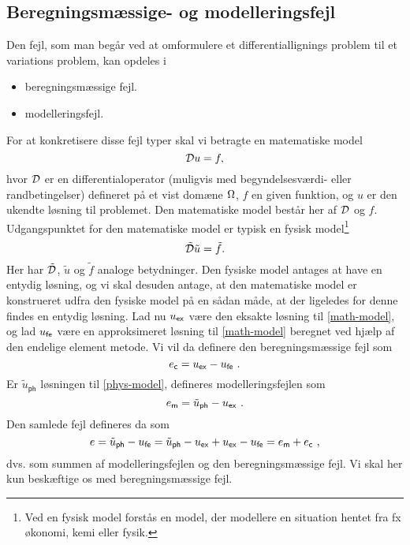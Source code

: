 \subsection{Beregningsmæssige- og modelleringsfejl}
Den fejl, som man begår ved at omformulere et differentiallignings
problem til et variations problem, kan opdeles i
\begin{itemize}
  \item beregningsmæssige fejl.
  \item modelleringsfejl.
\end{itemize}
For at konkretisere disse fejl typer skal vi betragte en matematiske model
\begin{equation} \label{math-model}
  {\mathcal{D}} u=f,
\end{equation}
hvor ${\mathcal{D}}$ er en differentialoperator (muligvis med begyndelsesværdi-
eller rand\-be\-tin\-gel\-ser) defineret på et vist domæne $\Omega$, $f$ en
given funktion, og $u$ er den ukendte løsning til problemet. Den
matematiske model består her af ${\mathcal{D}}$ og $f$. Udgangspunktet for den
matematiske model er typisk en fysisk model\footnote{Ved en fysisk
model forstås en model, der modellere en situation hentet fra fx
økonomi, kemi eller fysik.}
\begin{equation} \label{phys-model}
  \tilde{{\mathcal{D}}} \tilde{u} = \tilde{f}.
\end{equation}
Her har $\tilde{{\mathcal{D}}}$, $\tilde{u}$ og $\tilde{f}$ analoge betydninger.
Den fysiske model antages at have en entydig løsning, og vi skal
desuden antage, at den matematiske model er konstrueret udfra den
fysiske model på en sådan måde, at der ligeledes for denne findes en
entydig løsning. Lad nu $u_{\mathsf{ex}}$ være den eksakte løsning til
\eqref{math-model}, og lad $u_{\mathsf{fe}}$ være en approksimeret
løsning til \eqref{math-model} beregnet ved hjælp af den endelige
element metode. Vi vil da definere den beregningsmæssige fejl som
\begin{equation}
  e_{\mathsf{c}} = \uex - \ufe\ .
\end{equation}
Er $\tilde{u}_{\mathsf{ph}}$ løsningen til \eqref{phys-model},
defineres modelleringsfejlen som
\begin{equation}
  e_{\mathsf{m}} = \tilde{u}_{\mathsf{ph}} - u_{\mathsf{ex}}\ .
\end{equation}
Den samlede fejl defineres da som
\begin{equation}
  e=\tilde{u}_{\mathsf{ph}}-u_{\mathsf{fe}}=\tilde{u}_{\mathsf{ph}}-u_{\mathsf{ex}}+u_{\mathsf{ex}}-u_{\mathsf{fe}}
  =e_{\mathsf{m}} + e_{\mathsf{c}}\ ,
\end{equation}
dvs. som summen af modelleringsfejlen og den beregningsmæssige fejl.
Vi skal her  kun beskæftige os med beregningsmæssige fejl.

